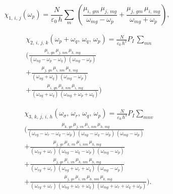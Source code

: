 \documentclass[12pt,twoside,a4paper]{article}
\numberwithin{equation}{subsection}
\numberwithin{figure}{subsection}
\begin{document}
\begin{equation} \label{eq:sresults_linear}   
  { \chi_{1, \, i, \, j } } ( {\omega_{p} } ) = \frac {N} { {\varepsilon_{0} } \, h} 
    \sum_{m} \, 
      ( \frac { {\mu_{i, \, gm} } \, {\mu_{j, \, mg} } } { {\omega_{mg} } - {\omega_{p} } } 
      + \frac { {\mu_{j, \, gm} } \, {\mu_{i, \, mg} } } { {\omega_{mg} } + {\omega_{p} } } ),
\end{equation}

\begin{equation} \label{eq:sresults_quadratical}
  \begin{split}
    & \chi_{2, \, i, \, j, \, k}({\omega_{p}} + {\omega_{q}}, \, {\omega_{q}}, \, {\omega_{p}}) = 
        \frac{N}{{\varepsilon_{0}}\,h^{2}}{P_{I}}\, \sum_{mn}\, 
 \\ & ( \frac{{\mu_{i, \, gn}} \, {\mu_{j,\,nm}} \, {\mu_{k, \, mg}}}
             {(\omega_{ng} - \omega_{p} - {\omega_{q}})\,({ \omega_{mg}} - {\omega_{p}})} 
 \\ & + \frac{{\mu_{j, \, gn}} \, {\mu_{i,\,nm}} \, {\mu_{k, \, mg}}}
             {(\omega_{ng} + \omega_{q})\,(\omega_{mg} - \omega_{p})}
 \\ & + \frac{{\mu_{i, \, gn}} \, {\mu_{k,\,nm}} \, {\mu_{i, \, mg}}}
             {(\omega_{ng} + \omega_{q})\,(\omega_{mg} + \omega_{p}+ \omega_{q})})
  \end{split} 
\end{equation}

\begin{equation} \label{eq:sresults_cubic}
  \begin{split}
    & \chi_{3, \,k, \,j, \,i, \,h} ({\omega_{\sigma }}, \,{\omega_{r}}, \,{\omega_{q}}, \,{\omega_{p}}) 
      = \frac{N}{{\varepsilon_{0}} \, h^{3}} {P_{I}} \! \sum_{mnv}\,
 \\ & ( \frac {{\mu_{k, \,gv}} \, {\mu_{j, \,vn}} \, {\mu_{i,\,nm}} \, {\mu_{h, \,mg}}} 
              {({\omega_{vg}} - {\omega_{r}} - {\omega_{q}} - {\omega_{p}})\,
               ({\omega_{ng}} - {\omega_{q}} - {\omega_{p}}) \,
               ({\omega_{mg}} - {\omega_{p}})} 
 \\ & + \frac {{\mu_{j, \,gv}} \, {\mu_{k, \,vn}} \, {\mu_{i, \,nm}} \, {\mu_{h, \,mg}}}
              {({\omega_{vg}} + {\omega_{r}}) \,
               ({\omega_{ng}} - {\omega_{q}} - {\omega_{p}}) \,
               ({\omega_{ mg}} - {\omega_{p}})} 
 \\ & + \frac {{\mu_{j, \,gv}} \, {\mu_{i, \,vn}} \, {\mu_{k, \,nm}} \, {\mu_{h, \,mg}}}
              {({\omega_{vg}} + {\omega_{r}}) \,
               ({\omega_{ng}} + {\omega_{r}} + {\omega_{q}}) \,
               ({\omega_{mg}} - {\omega_{p}})} 
 \\ & + \frac {{\mu_{j, \,gv}} \, {\mu_{i, \,vn}} \, {\mu_{h,\,nm}} \, {\mu_{k, \,mg}}}
              {({\omega_{vg}} + {\omega_{r}}) \, 
               ({\omega_{ng}} + {\omega_{r}} + {\omega_{q}} ) \, 
               ({\omega_{mg}} + {\omega_{r}} + {\omega_{q}} + { \omega_{p}})}).
  \end{split}
\end{equation}
\end{document}
